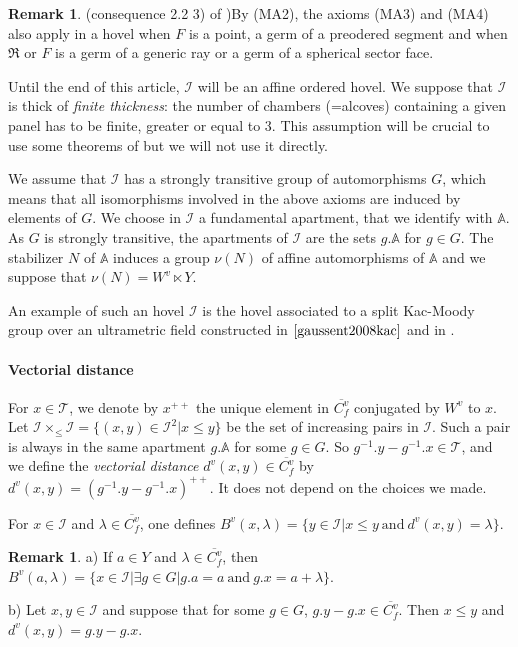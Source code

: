 \documentclass[12pt]{article}
\theoremstyle{plain}
\theoremstyle{definition}
\newtheorem{rque}[thm]{Remark}
\newcommand{\A}{\mathbb{A}}
\newcommand{\I}{\mathcal{I}}
\begin{document}
\begin{rque}(consequence 2.2 3) of \cite{rousseau2011masures})\label{rque axioms MA3 et MA4 modifiés}
By (MA2), the axioms (MA3) and (MA4) also apply in a hovel when $F$ is a point, a germ of a preodered segment and when $\mathfrak{R}$ or $F$ is a germ of a generic ray or a germ of a spherical sector face.
\end{rque}

\vspace{3mm}
Until the end of this article, $\I$ will be an affine ordered hovel. We suppose that $\I$ is thick of \textit{finite thickness}: the number of chambers (=alcoves) containing a given panel has to be finite, greater or equal to $3$. This assumption will be crucial to use some theorems of \cite{gaussent2014spherical} but we will not use it directly. 

We assume that $\I$ has a strongly transitive group of automorphisms $G$, which means that all isomorphisms involved in the above axioms are induced by elements of $G$. We choose in $\I$ a fundamental apartment, that we identify with $\A$. As $G$ is strongly transitive, the apartments of $\I$ are the sets $g.\A$ for $g\in G$. The stabilizer $N$ of $\A$ induces a group $\nu(N)$ of affine automorphisms of $\A$ and we suppose that $\nu(N)=W^v\ltimes Y$.

An example of such an hovel $\I$ is the hovel associated to a split Kac-Moody group over an ultrametric field constructed in $\cite{gaussent2008kac}$ and in \cite{rousseau2012almost}.

\paragraph{Vectorial distance}
For $x\in \mathcal{T}$, we denote by $x^{++}$ the unique element in $\overline{C^v_f}$ conjugated by $W^v$ to $x$. Let $\I\times_{\leq}\I=\{(x,y)\in \I^2|x\leq y\}$ be the set of increasing pairs in $\I$. Such a pair is always in the same apartment $g.\A$ for some $g\in G$. So $g^{-1}.y-g^{-1}.x\in \mathcal{T}$, and we define the \textit{vectorial distance} $d^v(x,y)\in\overline{C_f^v}$ by $d^v(x,y)=(g^{-1}.y-g^{-1}.x)^{++}$. It does not depend on the choices we made.

For $x\in \I$ and $\lambda\in \overline{C_f^v}$, one defines $B^v(x,\lambda)=\{y\in \I|x\leq y\mathrm{\ and\ }d^v(x,y)=\lambda\}$.

\begin{rque}\label{rque caractérisation distance vectorielle}
a) If $a\in Y$ and $\lambda\in \overline{C_f^v}$, then $B^v(a,\lambda)=\{x\in \I|\exists g\in G|g.a=a\mathrm{\ and\ }g.x=a+\lambda\}$.

b) Let $x,y\in \I$ and suppose that for some $g\in G$, $g.y-g.x\in \overline{C_f^v}$. Then $x\leq y$ and $d^v(x,y)=g.y-g.x$.
\end{rque}
\end{document}
